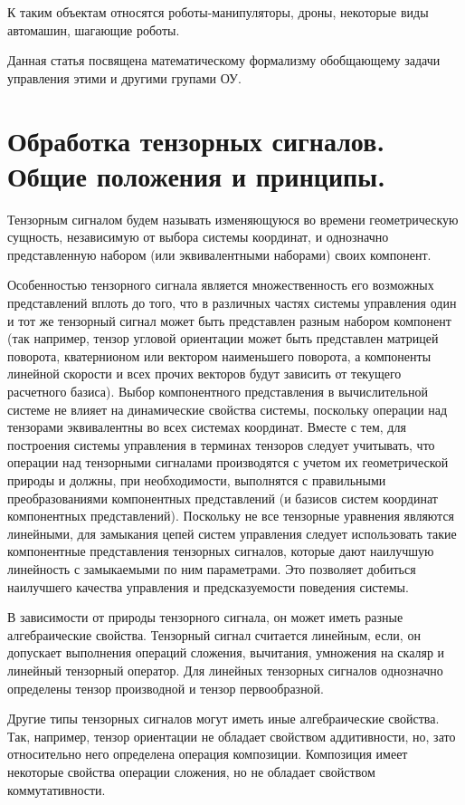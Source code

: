 \documentclass[a4paper]{article}
\begin{document}
К таким объектам относятся роботы-манипуляторы, дроны, некоторые виды автомашин, шагающие роботы. 

Данная статья посвящена математическому формализму обобщающему задачи управления этими и другими групами ОУ.

\section{Обработка тензорных сигналов. Общие положения и принципы.}
Тензорным сигналом будем называть изменяющуюся во времени геометрическую сущность, независимую от выбора системы координат, и однозначно представленную набором (или эквивалентными наборами) своих компонент. 

Особенностью тензорного сигнала является множественность его возможных представлений вплоть до того, что в различных частях системы управления один и тот же тензорный сигнал может быть представлен разным набором компонент (так например, тензор угловой ориентации может быть представлен матрицей поворота, кватернионом или вектором наименьшего поворота, а компоненты линейной скорости и всех прочих векторов будут зависить от текущего расчетного базиса). Выбор компонентного представления в вычислительной системе не влияет на динамические свойства системы, поскольку операции над тензорами эквивалентны во всех системах координат. Вместе с тем, для построения системы управления в терминах тензоров следует учитывать, что операции над тензорными сигналами производятся с учетом их геометрической природы и должны, при необходимости, выполнятся с правильными преобразованиями компонентных представлений (и базисов систем координат компонентных представлений). Поскольку не все тензорные уравнения являются линейными, для замыкания цепей систем управления следует использовать такие компонентные представления тензорных сигналов, которые дают наилучшую линейность с замыкаемыми по ним параметрами. Это позволяет добиться наилучшего качества управления и предсказуемости поведения системы.

В зависимости от природы тензорного сигнала, он может иметь разные алгебраические свойства. Тензорный сигнал считается линейным, если, он допускает выполнения операций сложения, вычитания, умножения на скаляр и линейный тензорный оператор. Для линейных тензорных сигналов однозначно определены тензор производной и тензор первообразной.

Другие типы тензорных сигналов могут иметь иные алгебраические свойства. Так, например, тензор ориентации не обладает свойством аддитивности, но, зато относительно него определена операция композиции. Композиция имеет некоторые свойства операции сложения, но не обладает свойством коммутативности.
\end{document}
